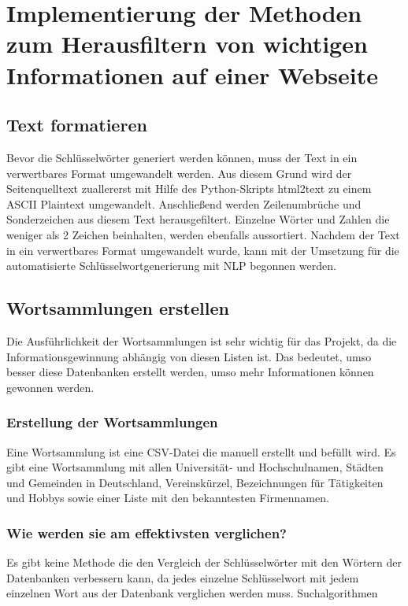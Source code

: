 \section{Implementierung der Methoden zum Herausfiltern von wichtigen Informationen auf einer Webseite}
	\subsection{Text formatieren}
	\label{subsec:TextFormatieren}
	Bevor die Schlüsselwörter generiert werden können, muss der Text in ein verwertbares Format umgewandelt werden. Aus diesem Grund wird der Seitenquelltext zuallererst mit Hilfe des Python-Skripts html2text zu einem ASCII Plaintext umgewandelt.\cite{html2text} Anschließend werden Zeilenumbrüche und Sonderzeichen aus diesem Text herausgefiltert. Einzelne Wörter und Zahlen die weniger als 2 Zeichen beinhalten, werden ebenfalls aussortiert. Nachdem der Text in ein verwertbares Format umgewandelt wurde, kann mit der Umsetzung für die automatisierte Schlüsselwortgenerierung mit NLP begonnen werden.
	
	\subsection{Wortsammlungen erstellen}
	Die Ausführlichkeit der Wortsammlungen ist sehr wichtig für das Projekt, da die Informationsgewinnung abhängig von diesen Listen ist. Das bedeutet, umso besser diese Datenbanken erstellt werden, umso mehr Informationen können gewonnen werden.
	
		\subsubsection{Erstellung der Wortsammlungen}	
		Eine Wortsammlung ist eine CSV-Datei die manuell erstellt und befüllt wird. Es gibt eine Wortsammlung mit allen Universität- und Hochschulnamen, Städten und Gemeinden in Deutschland, Vereinskürzel, Bezeichnungen für Tätigkeiten und Hobbys sowie einer Liste mit den bekanntesten Firmennamen. 
		\subsubsection{Wie werden sie am effektivsten verglichen?}
		Es gibt keine Methode die den Vergleich der Schlüsselwörter mit den Wörtern der Datenbanken verbessern kann, da jedes einzelne Schlüsselwort mit jedem einzelnen Wort aus der Datenbank verglichen werden muss. Suchalgorithmen
	

